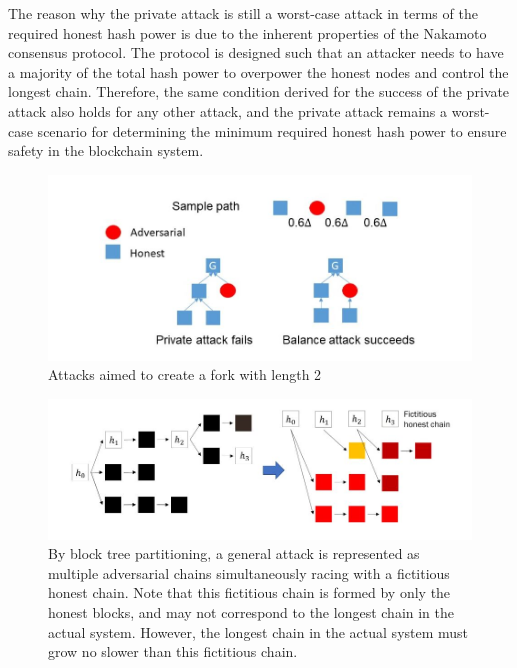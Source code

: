 The reason why the private attack is still a worst-case attack in terms of the required honest hash power is due to the inherent properties of the Nakamoto consensus protocol. The protocol is designed such that an attacker needs to have a majority of the total hash power to overpower the honest nodes and control the longest chain. Therefore, the same condition derived for the success of the private attack also holds for any other attack, and the private attack remains a worst-case scenario for determining the minimum required honest hash power to ensure safety in the blockchain system.
\begin{figure}[h!]
    \centering
    \includegraphics[width=0.6\linewidth]{Fig/06/F5}
    \caption{Attacks aimed to create a fork with length 2}
    \label{fig:f5}
\end{figure}
\begin{figure}[h!]
    \centering
    \includegraphics[width=0.6\linewidth]{Fig/06/F6}
    \caption{By block tree partitioning, a general attack is represented as multiple adversarial chains simultaneously racing with a fictitious honest chain. Note that this fictitious chain is formed by only the honest blocks, and may not correspond to the longest chain in the actual system. However, the longest chain in the actual system must grow no slower than this fictitious chain.}
    \label{fig:f6}
\end{figure}

